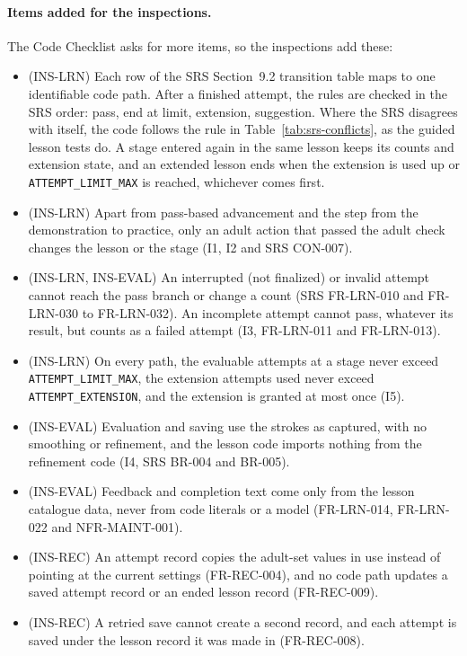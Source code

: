 \documentclass[12pt, titlepage]{article}
\begin{document}
\paragraph{Items added for the inspections.} The Code Checklist asks for
more items, so the inspections add these:
\begin{itemize}
\item[A1] (INS-LRN) Each row of the SRS Section~9.2 transition table maps
to one identifiable code path. After a finished attempt, the rules are
checked in the SRS order: pass, end at limit, extension, suggestion. Where
the SRS disagrees with itself, the code follows the rule in
Table~\ref{tab:srs-conflicts}, as the guided lesson tests do. A stage
entered again in the same lesson keeps its counts and extension state, and
an extended lesson ends when the extension is used up or
\texttt{ATTEMPT\_LIMIT\_MAX} is reached, whichever comes first.
\item[A2] (INS-LRN) Apart from pass-based advancement and the step from the
demonstration to practice, only an adult action that passed the adult check
changes the lesson or the stage (I1, I2 and SRS CON-007).
\item[A3] (INS-LRN, INS-EVAL) An interrupted (not finalized) or invalid
attempt cannot reach the pass branch or change a count (SRS FR-LRN-010 and
FR-LRN-030 to FR-LRN-032). An incomplete attempt cannot pass, whatever its result, but
counts as a failed attempt (I3, FR-LRN-011 and FR-LRN-013).
\item[A4] (INS-LRN) On every path, the evaluable attempts at a stage never
exceed \texttt{ATTEMPT\_LIMIT\_MAX}, the extension attempts used never
exceed \texttt{ATTEMPT\_EXTENSION}, and the extension is granted at most
once (I5).
\item[A5] (INS-EVAL) Evaluation and saving use the strokes as captured,
with no smoothing or refinement, and the lesson code imports nothing from
the refinement code (I4, SRS BR-004 and BR-005).
\item[A6] (INS-EVAL) Feedback and completion text come only from the lesson
catalogue data, never from code literals or a model (FR-LRN-014,
FR-LRN-022 and NFR-MAINT-001).
\item[A7] (INS-REC) An attempt record copies the adult-set values in use
instead of pointing at the current settings (FR-REC-004), and no code path
updates a saved attempt record or an ended lesson record (FR-REC-009).
\item[A8] (INS-REC) A retried save cannot create a second record, and each
attempt is saved under the lesson record it was made in (FR-REC-008).

\end{itemize}
\end{document}
